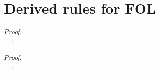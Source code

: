 \begin{minipage}{\textwidth} %
\section{Derived rules for FOL}

\begin{multicols}{2}
\begin{proof}

\\	
\end{proof}
\begin{proof}

\\	
\end{proof}
\end{multicols}
\end{minipage}
